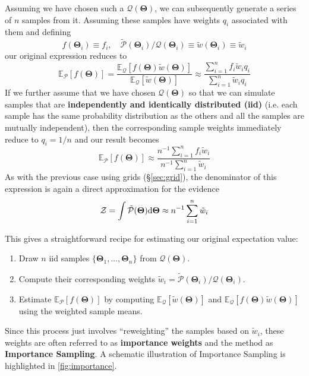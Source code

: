 \documentclass[12pt, titlepage]{article}
\newcommand{\deriv}{\ensuremath{{\rm d}}}  %
\newcommand{\meanwrt}[2]{\ensuremath{\mathbb{E}_{{#2}}\left[{#1}\right]}}
\newcommand{\params}{\ensuremath{\boldsymbol\Theta}}
\newcommand{\posterior}{\ensuremath{\mathcal{P}}}
\newcommand{\proposal}{\ensuremath{\mathcal{Q}}}
\newcommand{\evidence}{\ensuremath{\mathcal{Z}}}
\begin{document}
Assuming we have chosen such a $\proposal(\params)$, we can 
subsequently generate a series of $n$ samples from it. Assuming
these samples have weights $q_i$ associated with them and defining
\begin{equation}
    f(\params_i) \equiv f_i, \quad
    \tilde{\posterior}(\params_i)/\proposal(\params_i) 
    \equiv \tilde{w}(\params_i) \equiv \tilde{w}_i
\end{equation}
our original expression reduces to
\begin{equation}
    \meanwrt{f(\params)}{\posterior} 
    = \frac{\meanwrt{f(\params) 
    \tilde{w}(\params)}{\proposal}}
    {\meanwrt{\tilde{w}(\params)}{\proposal}}
    \approx \frac{\sum_{i=1}^{n} f_i \tilde{w}_i q_i}
    {\sum_{i=1}^{n} \tilde{w}_i q_i}
\end{equation}
If we further assume that we have chosen $\proposal(\params)$ so that
we can simulate samples that are 
\textbf{independently and identically distributed (iid)}
(i.e. each sample has the same probability distribution 
as the others and all the samples are mutually independent),
then the corresponding sample weights immediately reduce to 
$q_i = 1/n$ and our result becomes
\begin{equation}
    \meanwrt{f(\params)}{\posterior} 
    \approx \frac{n^{-1} \sum_{i=1}^{n} f_i \tilde{w}_i}
    {n^{-1} \sum_{i=1}^{n} \tilde{w}_i}
\end{equation}
As with the previous case using grids (\S\ref{sec:grid}),
the denominator of this
expression is again a direct approximation for the evidence
\begin{align}
    \evidence 
    = \int \tilde{\posterior}(\params) \deriv \params
    \approx n^{-1} \sum_{i=1}^{n} \tilde{w}_i
\end{align}

This gives a straightforward recipe for estimating our original expectation
value:
\begin{enumerate}
    \item Draw $n$ iid samples $\{\params_1, \dots, \params_n \}$
    from $\proposal(\params)$.
    \item Compute their corresponding weights $\tilde{w}_i =
    \tilde{\posterior}(\params_i)/\proposal(\params_i)$.
    \item Estimate $\meanwrt{f(\params)}{\posterior}$
    by computing $\meanwrt{\tilde{w}(\params)}{\proposal}$ and
    $\meanwrt{f(\params)\tilde{w}(\params)}{\proposal}$ using the
    weighted sample means.
\end{enumerate}
Since this process just involves ``reweighting'' the samples
based on $\tilde{w}_i$, these weights are often referred to as
\textbf{importance weights} and the method as \textbf{Importance Sampling}.
A schematic illustration of Importance Sampling
is highlighted in {\color{red} \autoref{fig:importance}}.
\end{document}
